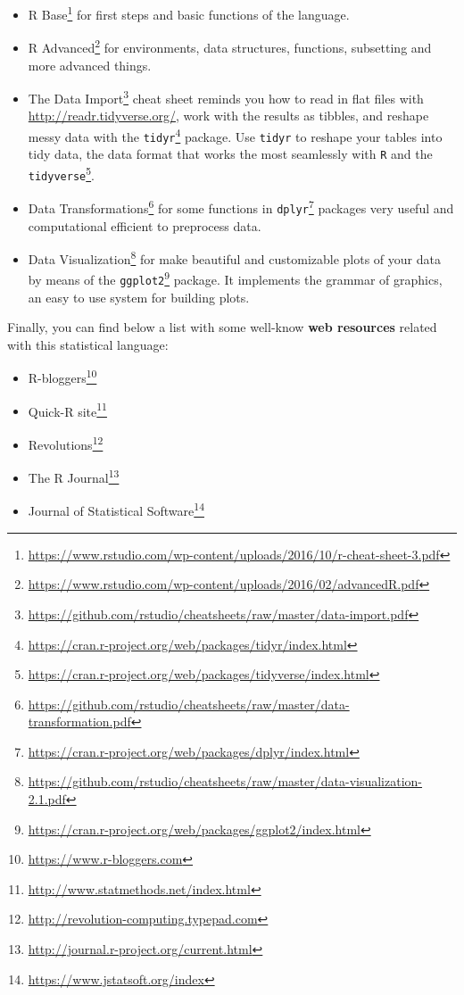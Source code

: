 \documentclass[]{book}
\providecommand{\tightlist}{%
  \setlength{\itemsep}{0pt}\setlength{\parskip}{0pt}}
\let\rmarkdownfootnote\footnote%
\def\footnote{\protect\rmarkdownfootnote}
\renewcommand{\href}[2]{#2\footnote{\url{#1}}}
\theoremstyle{definition}
\theoremstyle{definition}
\theoremstyle{definition}
\theoremstyle{remark}
\begin{document}
\begin{itemize}
\item
  \href{https://www.rstudio.com/wp-content/uploads/2016/10/r-cheat-sheet-3.pdf}{R
  Base} for first steps and basic functions of the language.
\item
  \href{https://www.rstudio.com/wp-content/uploads/2016/02/advancedR.pdf}{R
  Advanced} for environments, data structures, functions, subsetting and
  more advanced things.
\item
  The
  \href{https://github.com/rstudio/cheatsheets/raw/master/data-import.pdf}{Data
  Import} cheat sheet reminds you how to read in flat files with
  \url{http://readr.tidyverse.org/}, work with the results as tibbles,
  and reshape messy data with the
  \href{https://cran.r-project.org/web/packages/tidyr/index.html}{\texttt{tidyr}}
  package. Use \texttt{tidyr} to reshape your tables into tidy data, the
  data format that works the most seamlessly with \texttt{R} and the
  \href{https://cran.r-project.org/web/packages/tidyverse/index.html}{\texttt{tidyverse}}.
\item
  \href{https://github.com/rstudio/cheatsheets/raw/master/data-transformation.pdf}{Data
  Transformations} for some functions in
  \href{https://cran.r-project.org/web/packages/dplyr/index.html}{\texttt{dplyr}}
  packages very useful and computational efficient to preprocess data.
\item
  \href{https://github.com/rstudio/cheatsheets/raw/master/data-visualization-2.1.pdf}{Data
  Visualization} for make beautiful and customizable plots of your data
  by means of the
  \href{https://cran.r-project.org/web/packages/ggplot2/index.html}{\texttt{ggplot2}}
  package. It implements the grammar of graphics, an easy to use system
  for building plots.
\end{itemize}

Finally, you can find below a list with some well-know \textbf{web
resources} related with this statistical language:

\begin{itemize}
\tightlist
\item
  \href{https://www.r-bloggers.com}{R-bloggers}
\item
  \href{http://www.statmethods.net/index.html}{Quick-R site}
\item
  \href{http://revolution-computing.typepad.com}{Revolutions}
\item
  \href{http://journal.r-project.org/current.html}{The R Journal}
\item
  \href{https://www.jstatsoft.org/index}{Journal of Statistical
  Software}
\end{itemize}



\backmatter
\printindex
\end{document}
